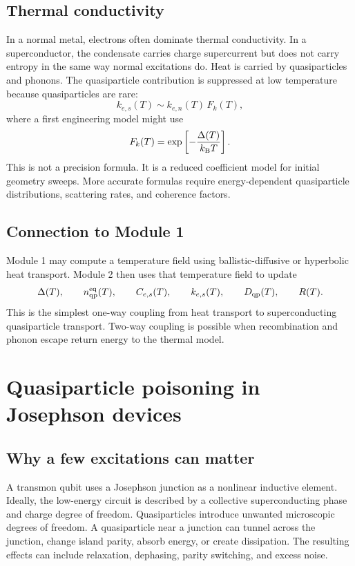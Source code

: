 \documentclass[11pt]{article}
\newcommand{\eq}{\mathrm{eq}}
\begin{document}
\subsection{Thermal conductivity}
In a normal metal, electrons often dominate thermal conductivity. In a superconductor, the condensate carries charge supercurrent but does not carry entropy in the same way normal excitations do. Heat is carried by quasiparticles and phonons. The quasiparticle contribution is suppressed at low temperature because quasiparticles are rare:
\begin{equation}
 k_{e,s}(T)\sim k_{e,n}(T)\,F_k(T),
\end{equation}
where a first engineering model might use
\begin{equation}
 F_k(T)=\exp\left[-\frac{\Delta(T)}{k_{\mathrm{B}} T}\right].
\end{equation}
This is not a precision formula. It is a reduced coefficient model for initial geometry sweeps. More accurate formulas require energy-dependent quasiparticle distributions, scattering rates, and coherence factors.

\subsection{Connection to Module 1}
Module 1 may compute a temperature field using ballistic-diffusive or hyperbolic heat transport. Module 2 then uses that temperature field to update
\begin{equation}
\Delta(T),\qquad n_{\qp}^{\eq}(T),\qquad C_{e,s}(T),\qquad k_{e,s}(T),\qquad D_{\qp}(T),\qquad R(T).
\end{equation}
This is the simplest one-way coupling from heat transport to superconducting quasiparticle transport. Two-way coupling is possible when recombination and phonon escape return energy to the thermal model.

\section{Quasiparticle poisoning in Josephson devices}

\subsection{Why a few excitations can matter}
A transmon qubit uses a Josephson junction as a nonlinear inductive element. Ideally, the low-energy circuit is described by a collective superconducting phase and charge degree of freedom. Quasiparticles introduce unwanted microscopic degrees of freedom. A quasiparticle near a junction can tunnel across the junction, change island parity, absorb energy, or create dissipation. The resulting effects can include relaxation, dephasing, parity switching, and excess noise.
\end{document}
